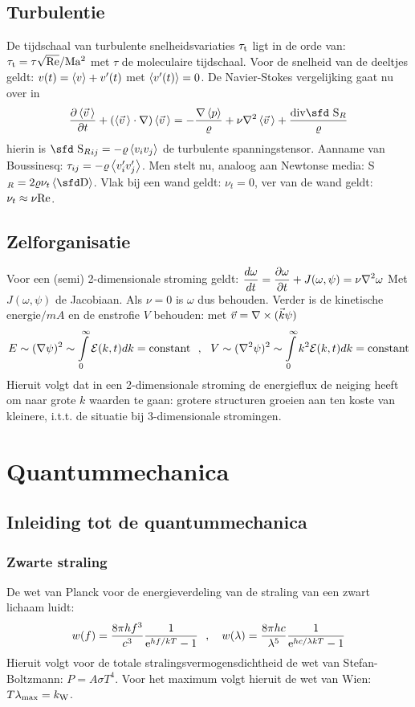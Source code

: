 \documentclass[twoside]{report}
\begin{document}
\section{Turbulentie}
De tijdschaal van turbulente snelheidsvariaties $\tau_{\rm t}$ ligt in de
orde van: $\tau_{\rm t}=\tau\sqrt{\rm Re}/{\rm Ma^2}$ met $\tau$ de
moleculaire tijdschaal. Voor de snelheid van de deeltjes geldt:
$v(t)=\left\langle v \right\rangle+v'(t)$ met $\left\langle v'(t) \right\rangle=0$. De Navier-Stokes vergelijking gaat nu
over in
\[
\Q{\av{\vv\,}}{t}+(\av{\vv\,}\cdot\nabla)\av{\vv\,}=-\frac{\nabla\av{p}}{\varrho}+
\nu\nabla^2\av{\vv\,}+\frac{{\rm div}\mbox{\sfd S}_R}{\varrho}
\]
hierin is ${\mbox{\sfd S}_R}_{ij}=-\varrho\av{v_i v_j}$ de turbulente
spanningstensor. Aanname van Boussinesq: $\tau_{ij}=-\varrho\left\langle v_i'v_j' \right\rangle$. Men
stelt nu, analoog aan Newtonse media: {\sfd S}$_R=2\varrho\nu_t\av{\DD}$. Vlak
bij een wand geldt: $\nu_t=0$, ver van de wand geldt: $\nu_t\approx\nu{\rm Re}$.

\section{Zelforganisatie}
Voor een (semi) 2-dimensionale stroming geldt:
$\displaystyle\frac{d\omega}{dt}=\frac{\partial \omega}{\partial t}+J(\omega,\psi)=\nu\nabla^2\omega$
\npar
Met $J(\omega,\psi)$ de Jacobiaan. Als $\nu=0$ is $\omega$ dus behouden.
Verder is de kinetische energie$/mA$ en de enstrofie $V$ behouden: met
$\vec{v}=\nabla\times(\vec{k}\psi)$
\[
E\sim(\nabla\psi)^2\sim\int\limits_0^\infty {\cal E}(k,t)dk=\mbox{constant}~~,~~
V\sim(\nabla^2\psi)^2\sim\int\limits_0^\infty k^2{\cal E}(k,t)dk=\mbox{constant}
\]
Hieruit volgt dat in een 2-dimensionale stroming de energieflux de neiging
heeft om naar grote $k$ waarden te gaan: grotere structuren groeien aan ten
koste van kleinere, i.t.t. de situatie bij 3-dimensionale stromingen.

\chapter{Quantummechanica}
\section[~~Inleiding tot de quantummechanica]{Inleiding tot de quantummechanica}
\subsection{Zwarte straling}
De wet van Planck voor de energieverdeling van de straling van een zwart
lichaam luidt:
\[
w(f)=\frac{8\pi hf^3}{c^3}\frac{1}{{\rm e}^{hf/kT}-1}~~,~~~
w(\lambda)=\frac{8\pi hc}{\lambda^5}\frac{1}{{\rm e}^{hc/\lambda kT}-1}
\]
Hieruit volgt voor de totale stralingsvermogensdichtheid de wet van
Stefan-Boltzmann: $P=A\sigma T^4$. Voor het maximum volgt hieruit de wet van
Wien: $T\lambda_{\rm max}=k_{\rm W}$.
\end{document}
